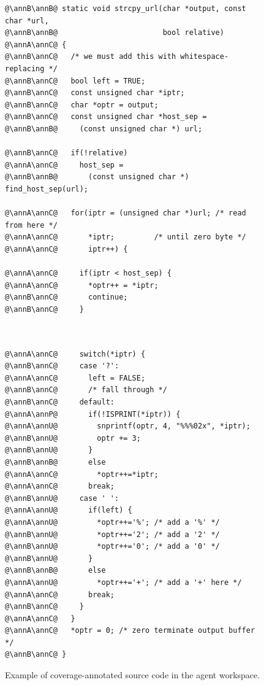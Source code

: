 \begin{figure}
  \centering
  \begin{minipage}[t]{0.49\linewidth}
  \begin{lstlisting}[style=annotatedsrc,showlines=true]
@\annB\annB@ static void strcpy_url(char *output, const char *url,
@\annB\annB@                        bool relative)
@\annA\annC@ {
@\annB\annC@   /* we must add this with whitespace-replacing */
@\annB\annC@   bool left = TRUE;
@\annB\annC@   const unsigned char *iptr;
@\annB\annC@   char *optr = output;
@\annB\annC@   const unsigned char *host_sep =
@\annB\annB@     (const unsigned char *) url;

@\annB\annC@   if(!relative)
@\annA\annC@     host_sep =
@\annB\annB@       (const unsigned char *) find_host_sep(url);

@\annA\annC@   for(iptr = (unsigned char *)url; /* read from here */
@\annA\annC@       *iptr;         /* until zero byte */
@\annA\annC@       iptr++) {

@\annA\annC@     if(iptr < host_sep) {
@\annA\annC@       *optr++ = *iptr;
@\annB\annC@       continue;
@\annB\annC@     }



  \end{lstlisting}
  \end{minipage}\hfill
  \begin{minipage}[t]{0.49\linewidth}
  \begin{lstlisting}[style=annotatedsrc]
@\annA\annC@     switch(*iptr) {
@\annB\annC@     case '?':
@\annA\annC@       left = FALSE;
@\annB\annC@       /* fall through */
@\annB\annC@     default:
@\annA\annP@       if(!ISPRINT(*iptr)) {
@\annA\annU@         snprintf(optr, 4, "%%%02x", *iptr);
@\annB\annU@         optr += 3;
@\annB\annU@       }
@\annB\annB@       else
@\annA\annC@         *optr++=*iptr;
@\annA\annC@       break;
@\annB\annU@     case ' ':
@\annA\annU@       if(left) {
@\annA\annU@         *optr++='%'; /* add a '%' */
@\annB\annU@         *optr++='2'; /* add a '2' */
@\annB\annU@         *optr++='0'; /* add a '0' */
@\annB\annU@       }
@\annB\annB@       else
@\annA\annU@         *optr++='+'; /* add a '+' here */
@\annA\annC@       break;
@\annB\annC@     }
@\annA\annC@   }
@\annA\annC@   *optr = 0; /* zero terminate output buffer */
@\annB\annC@ }
  \end{lstlisting}
  \end{minipage}
  \caption[Example of coverage-annotated source code in the agent workspace]{Example of coverage-annotated source code in the agent workspace.}
  \label{fig:annotated-source}
\end{figure}